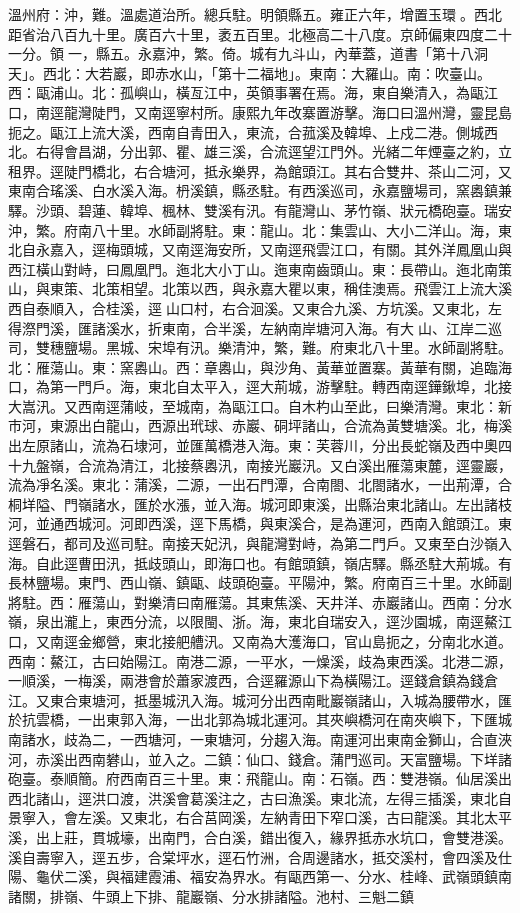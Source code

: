 \begin{pinyinscope}
溫州府：沖，難。溫處道治所。總兵駐。明領縣五。雍正六年，增置玉環。西北距省治八百九十里。廣百六十里，袤五百里。北極高二十八度。京師偏東四度二十一分。領一，縣五。永嘉沖，繁。倚。城有九斗山，內華蓋，道書「第十八洞天」。西北：大若巖，即赤水山，「第十二福地」。東南：大羅山。南：吹臺山。西：甌浦山。北：孤嶼山，橫亙江中，英領事署在焉。海，東自樂清入，為甌江口，南逕龍灣陡門，又南逕寧村所。康熙九年改寨置游擊。海口曰溫州灣，靈昆島扼之。甌江上流大溪，西南自青田入，東流，合菰溪及韓埠、上戍二港。側城西北。右得會昌湖，分出郭、瞿、雄三溪，合流逕望江門外。光緒二年煙臺之約，立租界。逕陡門橋北，右合塘河，抵永樂界，為館頭江。其右合雙井、茶山二河，又東南合瑤溪、白水溪入海。枬溪鎮，縣丞駐。有西溪巡司，永嘉鹽場司，窯嶴鎮兼驛。沙頭、碧蓮、韓埠、楓林、雙溪有汛。有龍灣山、茅竹嶺、狀元橋砲臺。瑞安沖，繁。府南八十里。水師副將駐。東：龍山。北：集雲山、大小二洋山。海，東北自永嘉入，逕梅頭城，又南逕海安所，又南逕飛雲江口，有關。其外洋鳳凰山與西江橫山對峙，曰鳳凰門。迤北大小丁山。迤東南齒頭山。東：長帶山。迤北南策山，與東策、北策相望。北策以西，與永嘉大瞿以東，稱佳澳焉。飛雲江上流大溪西自泰順入，合桂溪，逕山口村，右合洄溪。又東合九溪、方坑溪。又東北，左得漈門溪，匯諸溪水，折東南，合半溪，左納南岸塘河入海。有大山、江岸二巡司，雙穗鹽場。黑城、宋埠有汛。樂清沖，繁，難。府東北八十里。水師副將駐。北：雁蕩山。東：窯嶴山。西：章嶴山，與沙角、黃華並置寨。黃華有關，追臨海口，為第一門戶。海，東北自太平入，逕大荊城，游擊駐。轉西南逕鏵鍬埠，北接大嵩汛。又西南逕蒲岐，至城南，為甌江口。自木杓山至此，曰樂清灣。東北：新巿河，東源出白龍山，西源出玳球、赤巖、硐坪諸山，合流為黃雙塘溪。北，梅溪出左原諸山，流為石埭河，並匯萬橋港入海。東：芙蓉川，分出長蛇嶺及西中奧四十九盤嶺，合流為清江，北接蔡嶴汛，南接光巖汛。又白溪出雁蕩東麓，逕靈巖，流為凈名溪。東北：蒲溪，二源，一出石門潭，合南閤、北閤諸水，一出荊潭，合桐垟隘、門嶺諸水，匯於水漲，並入海。城河即東溪，出縣治東北諸山。左出諸枝河，並通西城河。河即西溪，逕下馬橋，與東溪合，是為運河，西南入館頭江。東逕磐石，都司及巡司駐。南接天妃汛，與龍灣對峙，為第二門戶。又東至白沙嶺入海。自此逕曹田汛，抵歧頭山，即海口也。有館頭鎮，嶺店驛。縣丞駐大荊城。有長林鹽場。東門、西山嶺、鎮甌、歧頭砲臺。平陽沖，繁。府南百三十里。水師副將駐。西：雁蕩山，對樂清曰南雁蕩。其東焦溪、天井洋、赤巖諸山。西南：分水嶺，泉出瀧上，東西分流，以限閩、浙。海，東北自瑞安入，逕沙園城，南逕鰲江口，又南逕金鄉營，東北接舥艚汛。又南為大濩海口，官山島扼之，分南北水道。西南：鰲江，古曰始陽江。南港二源，一平水，一燥溪，歧為東西溪。北港二源，一順溪，一梅溪，兩港會於蕭家渡西，合逕羅源山下為橫陽江。逕錢倉鎮為錢倉江。又東合東塘河，抵墨城汛入海。城河分出西南毗巖嶺諸山，入城為腰帶水，匯於抗雲橋，一出東郭入海，一出北郭為城北運河。其夾嶼橋河在南夾嶼下，下匯城南諸水，歧為二，一西塘河，一東塘河，分趨入海。南運河出東南金獅山，合直浹河，赤溪出西南礬山，並入之。二鎮：仙口、錢倉。蒲門巡司。天富鹽場。下垟諸砲臺。泰順簡。府西南百三十里。東：飛龍山。南：石嶺。西：雙港嶺。仙居溪出西北諸山，逕洪口渡，洪溪會葛溪注之，古曰漁溪。東北流，左得三插溪，東北自景寧入，會左溪。又東北，右合莒岡溪，左納青田下窄口溪，古曰龍溪。其北太平溪，出上莊，貫城壕，出南門，合白溪，錯出復入，緣界抵赤水坑口，會雙港溪。溪自壽寧入，逕五步，合棠坪水，逕石竹洲，合周邊諸水，抵交溪村，會四溪及仕陽、龜伏二溪，與福建霞浦、福安為界水。有甌西第一、分水、桂峰、武嶺頭鎮南諸關，排嶺、牛頭上下排、龍巖嶺、分水排諸隘。池村、三魁二鎮
\end{pinyinscope}
